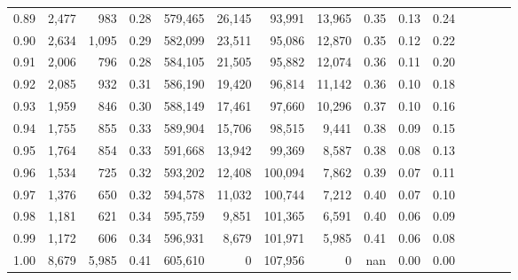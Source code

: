 \begin{tabular}{rrrcrrrrrrrrrrr}
0.89 &   2,477 &    983 &                                       0.28 &  579,465 &   26,145 &   93,991 &   13,965 &  0.35 &  0.13 &                         0.24 \\
0.90 &   2,634 &  1,095 &                                       0.29 &  582,099 &   23,511 &   95,086 &   12,870 &  0.35 &  0.12 &                         0.22 \\
0.91 &   2,006 &    796 &                                       0.28 &  584,105 &   21,505 &   95,882 &   12,074 &  0.36 &  0.11 &                         0.20 \\
0.92 &   2,085 &    932 &                                       0.31 &  586,190 &   19,420 &   96,814 &   11,142 &  0.36 &  0.10 &                         0.18 \\
0.93 &   1,959 &    846 &                                       0.30 &  588,149 &   17,461 &   97,660 &   10,296 &  0.37 &  0.10 &                         0.16 \\
0.94 &   1,755 &    855 &                                       0.33 &  589,904 &   15,706 &   98,515 &    9,441 &  0.38 &  0.09 &                         0.15 \\
0.95 &   1,764 &    854 &                                       0.33 &  591,668 &   13,942 &   99,369 &    8,587 &  0.38 &  0.08 &                         0.13 \\
0.96 &   1,534 &    725 &                                       0.32 &  593,202 &   12,408 &  100,094 &    7,862 &  0.39 &  0.07 &                         0.11 \\
0.97 &   1,376 &    650 &                                       0.32 &  594,578 &   11,032 &  100,744 &    7,212 &  0.40 &  0.07 &                         0.10 \\
0.98 &   1,181 &    621 &                                       0.34 &  595,759 &    9,851 &  101,365 &    6,591 &  0.40 &  0.06 &                         0.09 \\
0.99 &   1,172 &    606 &                                       0.34 &  596,931 &    8,679 &  101,971 &    5,985 &  0.41 &  0.06 &                         0.08 \\
1.00 &   8,679 &  5,985 &                                       0.41 &  605,610 &        0 &  107,956 &        0 &   nan &  0.00 &                         0.00 \\
\bottomrule
\end{tabular}
